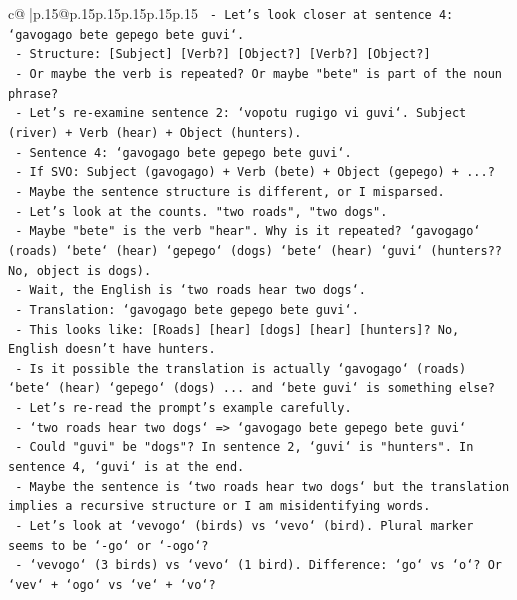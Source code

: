 \documentclass{article}
\begin{document}
{\begin{supertabular}{c@{$\;$}|p{.15\linewidth}@{}p{.15\linewidth}p{.15\linewidth}p{.15\linewidth}p{.15\linewidth}p{.15\linewidth}}
{{{\texttt{   {-} Let's look closer at sentence 4: `gavogago bete gepego bete guvi`.} \\
\texttt{     {-} Structure: {[}Subject{]} {[}Verb?{]} {[}Object?{]} {[}Verb?{]} {[}Object?{]}} \\
\texttt{     {-} Or maybe the verb is repeated? Or maybe "bete" is part of the noun phrase?} \\
\texttt{     {-} Let's re{-}examine sentence 2: `vopotu rugigo vi guvi`. Subject (river) + Verb (hear) + Object (hunters).} \\
\texttt{     {-} Sentence 4: `gavogago bete gepego bete guvi`.} \\
\texttt{       {-} If SVO: Subject (gavogago) + Verb (bete) + Object (gepego) + ...?} \\
\texttt{       {-} Maybe the sentence structure is different, or I misparsed.} \\
\texttt{       {-} Let's look at the counts. "two roads", "two dogs".} \\
\texttt{       {-} Maybe "bete" is the verb "hear". Why is it repeated? `gavogago` (roads) `bete` (hear) `gepego` (dogs) `bete` (hear) `guvi` (hunters?? No, object is dogs).} \\
\texttt{       {-} Wait, the English is `two roads hear two dogs`.} \\
\texttt{       {-} Translation: `gavogago bete gepego bete guvi`.} \\
\texttt{       {-} This looks like: {[}Roads{]} {[}hear{]} {[}dogs{]} {[}hear{]} {[}hunters{]}? No, English doesn't have hunters.} \\
\texttt{       {-} Is it possible the translation is actually `gavogago` (roads) `bete` (hear) `gepego` (dogs) ... and `bete guvi` is something else?} \\
\texttt{       {-} Let's re{-}read the prompt's example carefully.} \\
\texttt{       {-} `two roads hear two dogs` => `gavogago bete gepego bete guvi`} \\
\texttt{       {-} Could "guvi" be "dogs"? In sentence 2, `guvi` is "hunters". In sentence 4, `guvi` is at the end.} \\
\texttt{       {-} Maybe the sentence is `two roads hear two dogs` but the translation implies a recursive structure or I am misidentifying words.} \\
\texttt{       {-} Let's look at `vevogo` (birds) vs `vevo` (bird). Plural marker seems to be `{-}go` or `{-}ogo`?} \\
\texttt{         {-} `vevogo` (3 birds) vs `vevo` (1 bird). Difference: `go` vs `o`? Or `vev` + `ogo` vs `ve` + `vo`?} \\
}}}
\end{supertabular}}
\end{document}
